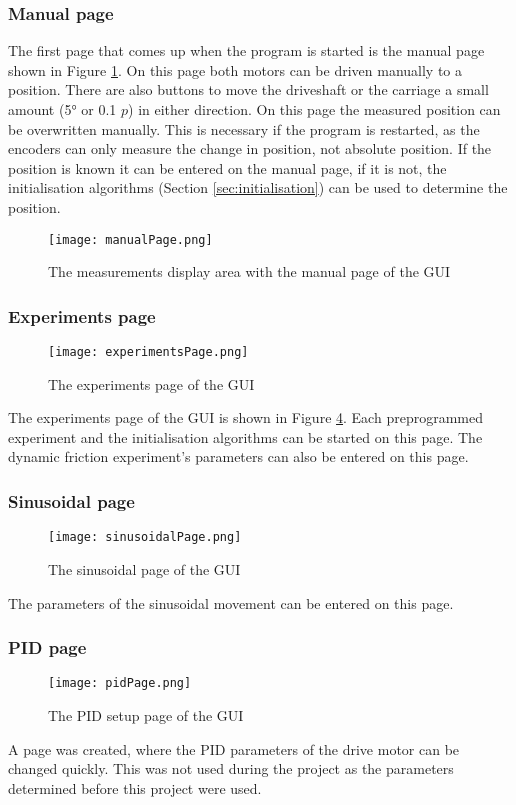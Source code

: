 \documentclass[12pt]{article}
\begin{document}
\subsubsection{Manual page}
The first page that comes up when the program is started is the manual page shown in Figure \ref{fig:manual}. On this page both motors can be driven manually to a position. There are also buttons to move the driveshaft or the carriage a small amount (5° or 0.1 $p$) in either direction. On this page the measured position can be overwritten manually. This is necessary if the program is restarted, as the encoders can only measure the change in position, not absolute position. If the position is known it can be entered on the manual page, if it is not, the initialisation algorithms (Section \ref{sec:initialisation}) can be used to determine the position.

\begin{figure}[h]
    \centering
    \texttt{[image: manualPage.png]}
    \caption{The measurements display area with the manual page of the GUI}
    \label{fig:manual}
\end{figure}

\subsubsection{Experiments page}
\begin{figure}[h]
    \centering
    \texttt{[image: experimentsPage.png]}
    \caption{The experiments page of the GUI}
    \label{fig:experimentsPage}
\end{figure}
The experiments page of the GUI is shown in Figure \ref{fig:experimentsPage}. Each preprogrammed experiment and the initialisation algorithms can be started on this page. The dynamic friction experiment's parameters can also be entered on this page.

\subsubsection{Sinusoidal page}
\begin{figure}[h]
    \centering
    \texttt{[image: sinusoidalPage.png]}
    \caption{The sinusoidal page of the GUI}
    \label{fig:experimentsPage}
\end{figure}
The parameters of the sinusoidal movement can be entered on this page.

\subsubsection{PID page}
\begin{figure}[h]
    \centering
    \texttt{[image: pidPage.png]}
    \caption{The PID setup page of the GUI}
    \label{fig:experimentsPage}
\end{figure}
A page was created, where the PID parameters of the drive motor can be changed quickly. This was not used during the project as the parameters determined before this project were used.
\end{document}
